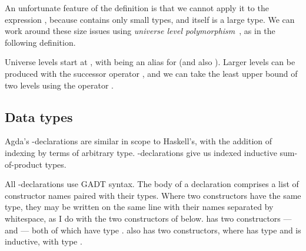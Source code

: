 
An unfortunate feature of the definition  is that we cannot
apply it to the expression , because 
contains only small types, and itself is a large type.
We can work around these size issues using
\emph{universe level polymorphism}~\citep{BCDE22},
as in the following definition.


Universe levels start at , with  being
an alias for \AgdaSpace{} (and also
).
Larger levels can be produced with the successor operator ,
and we can take the least upper bound of two levels using the operator
\AgdaPrimitive{\_$\sqcup$\_}.

\subsection{Data types}

Agda's -declarations are similar in scope to Haskell's, with
the addition of indexing by terms of arbitrary type.
-declarations give us indexed inductive sum-of-product types.

All -declarations use GADT syntax.
The body of a declaration comprises a list of constructor names paired with
their types.
Where two constructors have the same type, they may be written on the same line
with their names separated by whitespace, as I do with the two constructors of
 below.
 has two constructors ---  and
 --- both of which have type
.
 also has two constructors, where
 has type  and
 is inductive, with type
\AgdaSpace{}\AgdaKeyword{$\to$}\AgdaSpace{}%
.

\noindent
\begin{minipage}[t]{0.5\textwidth}
\end{minipage}
\begin{minipage}[t]{0.5\textwidth}
\end{minipage}

